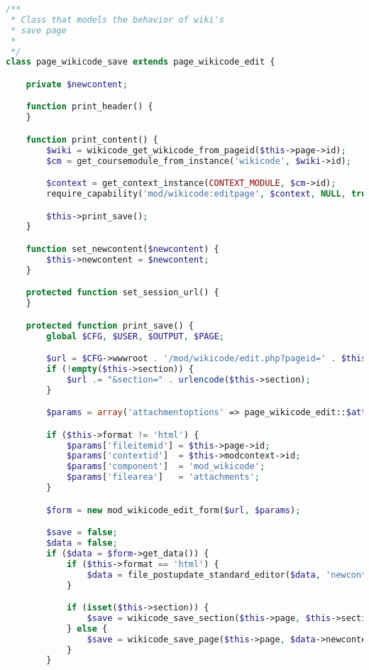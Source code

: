 \begin{lstlisting}[language=PHP]
/**
 * Class that models the behavior of wiki's
 * save page
 *
 */
class page_wikicode_save extends page_wikicode_edit {

    private $newcontent;

    function print_header() {
    }

    function print_content() {
		$wiki = wikicode_get_wikicode_from_pageid($this->page->id);
    	$cm = get_coursemodule_from_instance('wikicode', $wiki->id);

        $context = get_context_instance(CONTEXT_MODULE, $cm->id);
        require_capability('mod/wikicode:editpage', $context, NULL, true, 'noeditpermission', 'wikicode');

        $this->print_save();
    }

    function set_newcontent($newcontent) {
        $this->newcontent = $newcontent;
    }

    protected function set_session_url() {
    }

    protected function print_save() {
        global $CFG, $USER, $OUTPUT, $PAGE;

        $url = $CFG->wwwroot . '/mod/wikicode/edit.php?pageid=' . $this->page->id;
        if (!empty($this->section)) {
            $url .= "&section=" . urlencode($this->section);
        }

        $params = array('attachmentoptions' => page_wikicode_edit::$attachmentoptions, 'format' => $this->format, 'version' => $this->versionnumber);

        if ($this->format != 'html') {
            $params['fileitemid'] = $this->page->id;
            $params['contextid']  = $this->modcontext->id;
            $params['component']  = 'mod_wikicode';
            $params['filearea']   = 'attachments';
        }

        $form = new mod_wikicode_edit_form($url, $params);

        $save = false;
        $data = false;
        if ($data = $form->get_data()) {
            if ($this->format == 'html') {
                $data = file_postupdate_standard_editor($data, 'newcontent', page_wikicode_edit::$attachmentoptions, $this->modcontext, 'mod_wikicode', 'attachments', $this->subwiki->id);
            }

            if (isset($this->section)) {
                $save = wikicode_save_section($this->page, $this->section, $data->newcontent, $USER->id);
            } else {
                $save = wikicode_save_page($this->page, $data->newcontent, $USER->id);
            }
        }


\end{lstlisting}
